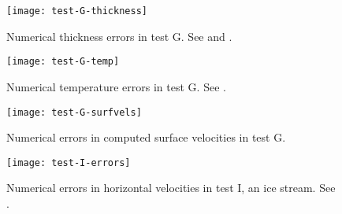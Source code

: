\begin{figure}[ht]
\centering
\texttt{[image: test-G-thickness]}
\caption{Numerical thickness errors in test G.  See \cite{BBL} and \cite{BLKCB}.}
\label{fig:thickerrsG}
\end{figure}

\begin{figure}[ht]
\centering
\texttt{[image: test-G-temp]}
\caption{Numerical temperature errors in test G. See \cite{BBL}.}
\label{fig:temperrsG}
\end{figure}

\begin{figure}[ht]
\centering
\texttt{[image: test-G-surfvels]}
\caption{Numerical errors in computed surface velocities in test G.}
\label{fig:surfvelerrsG}
\end{figure}

\begin{figure}[ht]
\centering
\texttt{[image: test-I-errors]}
\caption{Numerical errors in horizontal velocities in test I, an ice stream. See \cite{SchoofStream,BBssasliding}.}
\label{fig:velerrsI}
\end{figure}

